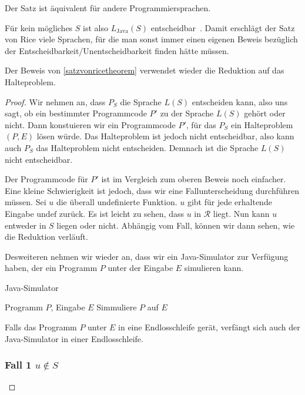 \documentclass[journal]{IEEEtran}
\begin{document}
Der Satz ist äquivalent für andere Programmiersprachen.

Für kein mögliches $S$ ist also $L_\text{Java}(S)$ entscheidbar~\cite{satzvonricebraun}. Damit erschlägt der Satz von Rice viele Sprachen, für die man sonst immer einen eigenen Beweis bezüglich der Entscheidbarkeit/Unentscheidbarkeit finden hätte müssen.

Der Beweis von \ref{satzvonricetheorem} verwendet wieder die Reduktion auf das Halteproblem.

\begin{proof}

Wir nehmen an, dass $P_S$ die Sprache $L(S)$ entscheiden kann, also uns sagt, ob ein bestimmter Programmcode $P'$ zu der Sprache $L(S)$ gehört oder nicht. Dann konstuieren wir ein Programmcode $P'$, für das $P_S$ ein Halteproblem $(P, E)$ lösen würde. Das Halteproblem ist jedoch nicht entscheidbar, also kann auch $P_S$ das Halteproblem nicht entscheiden. Demnach ist die Sprache $L(S)$ nicht entscheidbar.

Der Programmcode für $P'$ ist im Vergleich zum oberen Beweis noch einfacher. Eine kleine Schwierigkeit ist jedoch, dass wir eine Fallunterscheidung durchführen müssen. Sei $u$ die überall undefinierte Funktion. $u$ gibt für jede erhaltende Eingabe $\mathrm{undef}$ zurück. Es ist leicht zu sehen, dass $u$ in $\mathcal{R}$ liegt. Nun kann $u$ entweder in $S$ liegen oder nicht. Abhängig vom Fall, können wir dann sehen, wie die Reduktion verläuft.

Desweiteren nehmen wir wieder an, dass wir ein Java-Simulator zur Verfügung haben, der ein Programm $P$ unter der Eingabe $E$ simulieren kann.

\begin{algorithm}
\caption{Java-Simulator}
\begin{algorithmic}[1]
\renewcommand{\algorithmicrequire}{\textbf{Input:}}
\renewcommand{\algorithmicensure}{\textbf{Output:}}
\REQUIRE Programm $P$, Eingabe $E$
\STATE Simmuliere $P$ auf $E$
\end{algorithmic}
\end{algorithm}

Falls das Programm $P$ unter $E$ in eine Endlosschleife gerät, verfängt sich auch der Java-Simulator in einer Endlosschleife.

\subsubsection{Fall 1 $u \notin S$}


\end{proof}
\end{document}
